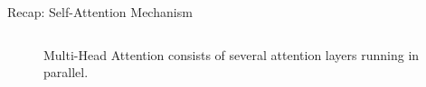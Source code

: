 \begin{frame}{Recap: Self-Attention Mechanism}
\begin{columns}
\begin{column}{0.5\textwidth}
\begin{figure}
                \caption{
                Multi-Head Attention consists of several attention layers running in parallel.
                }
                \label{fig:multihead}
            \end{figure}
        \end{column}
    \end{columns}
\end{frame}



